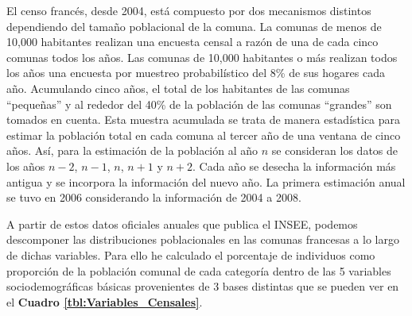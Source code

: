 {\color{Aquamarine} El censo francés, desde 2004, está compuesto por dos mecanismos distintos dependiendo del tamaño poblacional de la comuna. La comunas de menos de 10,000 habitantes realizan una encuesta censal a razón de una de cada cinco comunas todos los años. Las comunas de 10,000 habitantes o más realizan todos los años una encuesta por muestreo probabilístico del 8\% de sus hogares cada año. Acumulando cinco años, el total de los habitantes de las comunas ``pequeñas'' y al rededor del 40\% de la población de las comunas ``grandes'' son tomados en cuenta. Esta muestra acumulada se trata de manera estadística para estimar la población total en cada comuna al tercer año de una ventana de cinco años. Así, para la estimación de la población al año $n$ se consideran los datos de los años $n-2$, $n-1$, $n$, $n+1$ y $n+2$. Cada año se desecha la información más antigua y se incorpora la información del nuevo año.  La primera estimación anual se tuvo en 2006 considerando la información de 2004 a 2008.
}

A partir de estos datos oficiales anuales que publica el INSEE, podemos descomponer las distribuciones poblacionales en las comunas francesas a lo largo de dichas variables. Para ello he calculado el porcentaje de individuos como proporción de la población comunal de cada categoría dentro de las 5 variables sociodemográficas básicas provenientes de 3 bases distintas que se pueden ver en el \textbf{Cuadro \ref{tbl:Variables_Censales}}.\\ 

